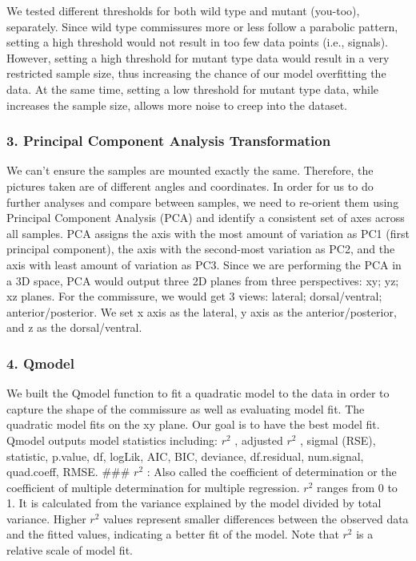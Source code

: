 \documentclass[10pt,letterpaper]{article}
\begin{document}
We tested different thresholds for both wild type and mutant (you-too),
separately. Since wild type commissures more or less follow a parabolic
pattern, setting a high threshold would not result in too few data
points (i.e., signals). However, setting a high threshold for mutant
type data would result in a very restricted sample size, thus increasing
the chance of our model overfitting the data. At the same time, setting
a low threshold for mutant type data, while increases the sample size,
allows more noise to creep into the dataset.

\subsubsection{3. Principal Component Analysis
Transformation}\label{principal-component-analysis-transformation}

We can't ensure the samples are mounted exactly the same. Therefore, the
pictures taken are of different angles and coordinates. In order for us
to do further analyses and compare between samples, we need to re-orient
them using Principal Component Analysis (PCA) and identify a consistent
set of axes across all samples. PCA assigns the axis with the most
amount of variation as PC1 (first principal component), the axis with
the second-most variation as PC2, and the axis with least amount of
variation as PC3. Since we are performing the PCA in a 3D space, PCA
would output three 2D planes from three perspectives: xy; yz; xz planes.
For the commissure, we would get 3 views: lateral; dorsal/ventral;
anterior/posterior. We set x axis as the lateral, y axis as the
anterior/posterior, and z as the dorsal/ventral.

\subsubsection{4. Qmodel}\label{qmodel}

We built the Qmodel function to fit a quadratic model to the data in
order to capture the shape of the commissure as well as evaluating model
fit. The quadratic model fits on the xy plane. Our goal is to have the
best model fit. Qmodel outputs model statistics including: \(r^2\) ,
adjusted \(r^2\) , sigmal (RSE), statistic, p.value, df, logLik, AIC,
BIC, deviance, df.residual, num.signal, quad.coeff, RMSE. \#\#\# \(r^2\)
: Also called the coefficient of determination or the coefficient of
multiple determination for multiple regression. \(r^2\) ranges from 0 to
1. It is calculated from the variance explained by the model divided by
total variance. Higher \(r^2\) values represent smaller differences
between the observed data and the fitted values, indicating a better fit
of the model. Note that \(r^2\) is a relative scale of model fit.
\end{document}
